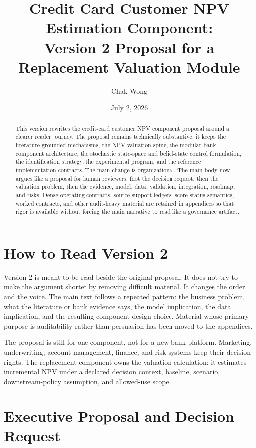 \documentclass[11pt]{article}
\title{Credit Card Customer NPV Estimation Component:\\
Version 2 Proposal for a Replacement Valuation Module}
\author{Chak Wong}
\date{July 2, 2026}
\newcommand{\1}{\mathbf{1}}
\begin{document}
\maketitle

\begin{abstract}
This version rewrites the credit-card customer NPV component proposal around a
clearer reader journey.  The proposal remains technically substantive: it keeps
the literature-grounded mechanisms, the NPV valuation spine, the modular bank
component architecture, the stochastic state-space and belief-state control
formulation, the identification strategy, the experimental program, and the
reference implementation contracts.  The main change is organizational.  The
main body now argues like a proposal for human reviewers: first the decision
request, then the valuation problem, then the evidence, model, data, validation,
integration, roadmap, and risks.  Dense operating contracts, source-support
ledgers, score-status semantics, worked contracts, and other audit-heavy
material are retained in appendices so that rigor is available without forcing
the main narrative to read like a governance artifact.
\end{abstract}

\section*{How to Read Version 2}

Version 2 is meant to be read beside the original proposal.  It does not try to
make the argument shorter by removing difficult material.  It changes the order
and the voice.  The main text follows a repeated pattern: the business problem,
what the literature or bank evidence says, the model implication, the data
implication, and the resulting component design choice.  Material whose primary
purpose is auditability rather than persuasion has been moved to the appendices.

The proposal is still for one component, not for a new bank platform.  Marketing,
underwriting, account management, finance, and risk systems keep their decision
rights.  The replacement component owns the valuation calculation: it estimates
incremental NPV under a declared decision context, baseline, scenario,
downstream-policy assumption, and allowed-use scope.

\tableofcontents
\clearpage

\section{Executive Proposal and Decision Request}
\label{sec:executive-charter}
\end{document}

